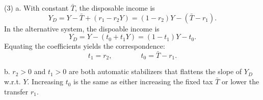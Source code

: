 \documentclass[12pt]{article}
\numberwithin{equation}{section}
\begin{document}
\begin{enumerate}[label=\arabic*.]
    (3) a. With constant $\bar{T}$, the disposable income is
    \[Y_D = Y - \bar{T} + (r_1 - r_2 Y) = (1-r_2)Y - (\bar{T} - r_1).\]
    In the alternative system, the dispoable income is
    \[Y_D = Y - (t_0 + t_1 Y) = (1 - t_1)Y - t_0.\]
    Equating the coefficients yields the correspondence:
    \[t_1 = r_2, \qquad \qquad t_0 = \bar{T} - r_1.\]
    
    b. $r_2>0$ and $t_1>0$ are both automatic stabilizers that flattens the slope of $Y_D$ w.r.t. $Y$. Increasing $t_0$ is the same as either increasing the fixed tax $\bar{T}$ or lower the transfer $r_1$.
\end{enumerate}
\end{document}
